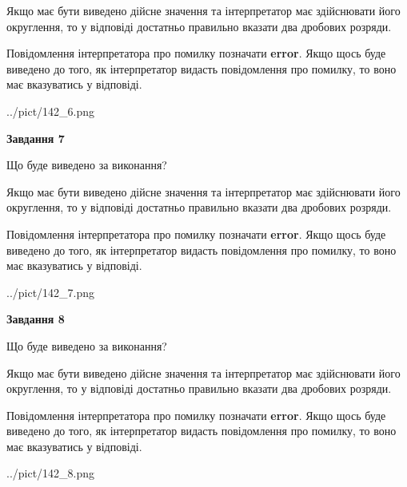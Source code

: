 \documentclass[12pt, ukrainian]{article}
\begin{document}
{\begin {Large}
Якщо має бути виведено дійсне значення та інтерпретатор має здійснювати його округлення, 
то у відповіді достатньо правильно вказати два дробових розряди.

Повідомлення інтерпретатора про помилку позначати \textbf{error}.
Якщо щось буде виведено до того, як інтерпретатор видасть повідомлення про помилку, 
то воно має вказуватись у відповіді. \par

\begin{center}
	{../pict/142_6.png}
\end{center}
\newpage

{\begin {center}\textbf{Завдання 7}\end {center}}\par
Що буде виведено за виконання? \par

Якщо має бути виведено дійсне значення та інтерпретатор має здійснювати його округлення, 
то у відповіді достатньо правильно вказати два дробових розряди.

Повідомлення інтерпретатора про помилку позначати \textbf{error}.
Якщо щось буде виведено до того, як інтерпретатор видасть повідомлення про помилку, 
то воно має вказуватись у відповіді. \par

\begin{center}
	{../pict/142_7.png}
\end{center}
\newpage

{\begin {center}\textbf{Завдання 8}\end {center}}\par
Що буде виведено за виконання? \par

Якщо має бути виведено дійсне значення та інтерпретатор має здійснювати його округлення, 
то у відповіді достатньо правильно вказати два дробових розряди.

Повідомлення інтерпретатора про помилку позначати \textbf{error}.
Якщо щось буде виведено до того, як інтерпретатор видасть повідомлення про помилку, 
то воно має вказуватись у відповіді. \par

\begin{center}
	{../pict/142_8.png}
\end{center}
\newpage


\end{Large}}
\end{document}
